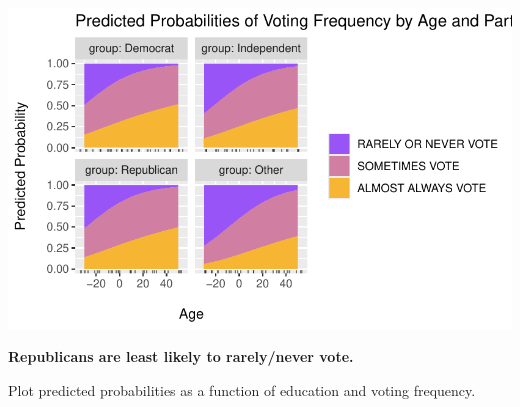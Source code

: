 \documentclass[
  letterpaper,
  DIV=11,
  numbers=noendperiod]{scrartcl}
\begin{document}
\includegraphics{Lab4_multinom_Questions-1_files/figure-pdf/unnamed-chunk-15-1.pdf}

\textbf{Republicans are least likely to rarely/never vote.}

Plot predicted probabilities as a function of education and voting
frequency.
\end{document}
